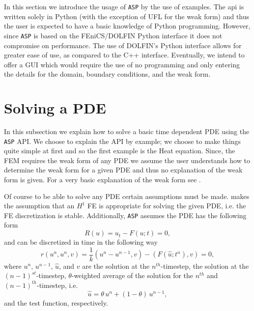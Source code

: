 In this section we introduce the usage of \texttt{ASP} by the use of examples.
The \ASP api is written solely in Python (with the exception of UFL for the weak
form) and thus the user is expected to have a basic knowledge of Python
programming.  However, since \texttt{ASP} is based on the FEniCS/DOLFIN Python
interface it does not compromise on performance\cite{Alnae2011}. The use of
DOLFIN's Python interface allows for greater ease of use, as compared to the C++
interface. Eventually, we intend to offer a GUI which would require the use of
no programming and only entering the details for the domain, boundary
conditions, and the weak form.

\section{Solving a PDE} \label{sec:Solver}

    In this subsection we explain how to solve a basic time dependent PDE using
    the \texttt{ASP} API. We choose to explain the API by example; we choose to
    make things quite simple at first and so the first example is the Heat
    equation.  Since, the FEM requires the weak form of any PDE we assume
    the user understands how to determine the weak form for a given PDE and thus
    no explanation of the weak form is given. For a very basic explanation of
    the weak form see \cite[Chapter 6.2.2]{Eriksson2009}.

    Of course to be able to solve any PDE certain assumptions must be made. \ASP
    makes the assumption that an $H^1$ FE is appropriate for solving the given
    PDE, i.e. the FE discretization is stable. Additionally, \texttt{ASP} assumes the
    PDE has the following form
    \begin{equation}
        R(u) = u_t - F(u;t) = 0,
        \label{eq:BasicForm}
    \end{equation}
    and can be discretized in time in the following way
    \begin{equation}
        r(u^n, u^n, v) = \frac{1}{k} (u^n - u^{n-1}, v) - (F(\hat{u};t^n), v) = 0,
        \label{eq:WeakResidual}
    \end{equation}
    where $u^n,\, u^{n-1},\, \hat{u}$, and $v$ are the solution at the
    $n^{th}$-timestep, the solution at the $(n-1)^{st}$-timestep,
    $\theta$-weighted average of the solution for the $n^{th}$ and
    $(n-1)^{th}$-timestep, i.e.
    \begin{equation}
        \hat{u} = \theta\, u^n + (1 - \theta)\, u^{n-1},
        \label{eq:uAvg}
    \end{equation}
    and the test function, respectively.


